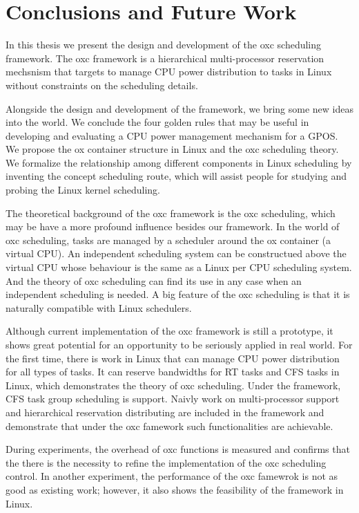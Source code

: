 \chapter{Conclusions and Future Work\label{chap:con}}
In this thesis we present the design and development of the oxc scheduling
framework. The oxc framework is a hierarchical multi-processor reservation 
mechsnism that targets to manage CPU power distribution to tasks in Linux
without constraints on the scheduling details. 

Alongside the design and development of the framework, we bring some
new ideas into the world. We conclude the four golden rules that may
be useful in developing and evaluating a CPU power management 
mechanism for a GPOS. We propose the ox container structure in Linux
and the oxc scheduling theory. We formalize the relationship among
different components in Linux scheduling by inventing the concept
scheduling route, which will assist people for studying and probing
the Linux kernel scheduling.

The theoretical background of the oxc framework is the oxc scheduling,
which may be have a more profound influence besides our framework. 
In the world of oxc scheduling, tasks are managed by a scheduler around 
the ox container (a virtual CPU). An independent scheduling system can 
be constructued above the virtual CPU whose behaviour is the same as a 
Linux per CPU scheduling system. And the theory of oxc scheduling can 
find its use in any case when an independent scheduling is needed. A big 
feature of the oxc scheduling is that it is naturally compatible with 
Linux schedulers. 

Although current implementation of the oxc framework is still a prototype,
it shows great potential for an opportunity to be seriously applied in real
world. For the first time, there is work in Linux that can manage CPU power
distribution for all types of tasks. It can reserve bandwidths for RT tasks
and CFS tasks in Linux, which demonstrates the theory of oxc scheduling. 
Under the framework, CFS task group scheduling is support.
Naivly work on multi-processor support and hierarchical reservation 
distributing are included in the framework and demonstrate that under 
the oxc famework such functionalities are achievable.  

During experiments, the overhead of oxc functions is measured and 
confirms that the there is the necessity to refine the implementation
of the oxc scheduling control. In another experiment, the performance of
the oxc famewrok is not as good as existing work; however, it also shows
the feasibility of the framework in Linux.

